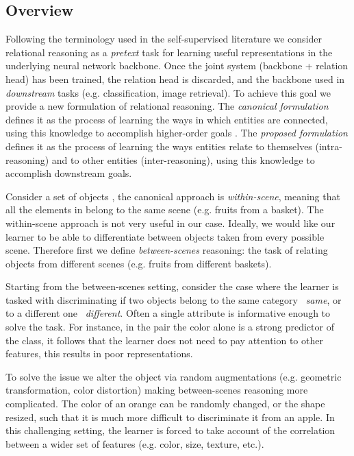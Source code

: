\documentclass{article}
\begin{document}
\subsection{Overview}

Following the terminology used in the self-supervised literature \citep{jing2020self} we consider relational reasoning as a \emph{pretext} task for learning useful representations in the underlying neural network backbone. Once the joint system (backbone + relation head) has been trained, the relation head is discarded, and the backbone used in \emph{downstream} tasks (e.g. classification, image retrieval). To achieve this goal we provide a new formulation of relational reasoning. The \emph{canonical formulation} defines it as the process of learning the ways in which entities are connected, using this knowledge to accomplish higher-order goals \citep{santoro2017simple, santoro2018relational}. The \emph{proposed formulation} defines it as the process of learning the ways entities relate to themselves (intra-reasoning) and to other entities (inter-reasoning), using this knowledge to accomplish downstream goals.

Consider a set of objects , the canonical approach is \emph{within-scene}, meaning that all the elements in  belong to the same scene (e.g. fruits from a basket). The within-scene approach is not very useful in our case. Ideally, we would like our learner to be able to differentiate between objects taken from every possible scene. Therefore first we define \emph{between-scenes} reasoning: the task of relating objects from different scenes (e.g. fruits from different baskets).

Starting from the between-scenes setting, consider the case where the learner is tasked with discriminating if two objects  belong to the same category ~\emph{same}, or to a different one ~\emph{different}. Often a single attribute is informative enough to solve the task. For instance, in the pair  the color alone is a strong predictor of the class, it follows that the learner does not need to pay attention to other features, this results in poor representations. 

To solve the issue we alter the object  via random augmentations  (e.g. geometric transformation, color distortion) making between-scenes reasoning more complicated. The color of an orange can be randomly changed, or the shape resized, such that it is much more difficult to discriminate it from an apple. In this challenging setting, the learner is forced to take account of the correlation between a wider set of features (e.g. color, size, texture, etc.).
\end{document}
